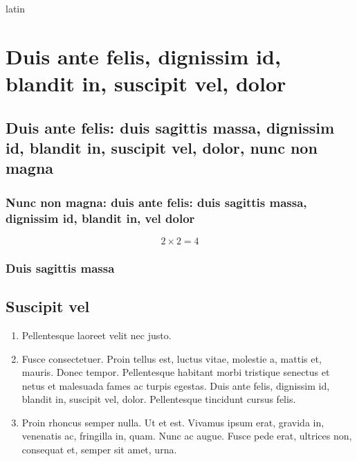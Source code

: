 \documentclass{fidata-report-template}
\begin{document}
\begin{otherlanguage*}{latin}

\chapter{Duis ante felis, dignissim id, blandit in, suscipit vel,
  dolor}
\section{Duis ante felis: duis sagittis massa, dignissim id, blandit
  in, suscipit vel, dolor, nunc non magna}
\subsection{Nunc non magna: duis ante felis: duis sagittis massa,
  dignissim id, blandit in, vel dolor}
\lipsum[6]

\begin{equation}
  \label{eq:eq}
  2\times2=4
\end{equation}

\subsection{Duis sagittis massa}

\lipsum[7-9]

\section{Suscipit vel}

\lipsum[23]

\begin{enumerate}
\item Pellentesque laoreet velit nec justo.
\item Fusce consectetuer. Proin tellus est, luctus vitae,
  molestie a, mattis et, mauris. Donec tempor. Pellentesque habitant
  morbi tristique senectus et netus et malesuada fames ac turpis
  egestas. Duis ante felis, dignissim id, blandit in, suscipit vel,
  dolor. Pellentesque tincidunt cursus felis.
\item Proin rhoncus semper
  nulla. Ut et est. Vivamus ipsum erat, gravida in, venenatis ac,
  fringilla in, quam. Nunc ac augue. Fusce pede erat, ultrices non,
  consequat et, semper sit amet, urna.
\end{enumerate}

\lipsum[17-18]

\end{otherlanguage*}
\end{document}
